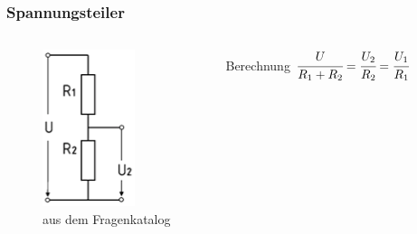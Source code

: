 \begin{frame}
  \frametitle{Spannungsteiler}
  \begin{columns}
    \begin{center}
      \begin{figure}
        \includegraphics[width=.6\textwidth,height=.75\textheight,keepaspectratio]{e04/Spannungsteiler.png}
        \caption{aus dem Fragenkatalog}
      \end{figure}
    \end{center}
    \begin{block}{Berechnung}
      $\cfrac{U}{R_1 + R_2} = \cfrac{U_2}{R_2} = \cfrac{U_1}{R_1}$
    \end{block}
  \end{columns}
\end{frame}


